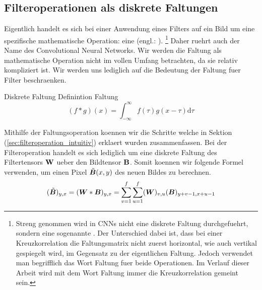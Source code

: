 \subsection{Filteroperationen als diskrete Faltungen}
Eigentlich handelt es sich bei einer Anwendung eines Filters auf ein Bild um
eine spezifische mathematische Operation: eine  (engl.:
).
\footnote{
  Streng genommen wird in CNNs nicht eine diskrete Faltung durchgefuehrt, sondern
  eine sogenannte . Der Unterschied dabei ist, dass bei einer
  Kreuzkorrelation die Faltungsmatrix nicht zuerst horizontal, wie auch vertikal
  gespiegelt wird, im Gegensatz zu der eigentlichen Faltung. Jedoch verwendet man
  begrifflich das Wort Faltung fuer beide Operationen. Im Verlauf dieser Arbeit
  wird mit dem Wort Faltung immer die Kreuzkorrelation gemeint sein.
}
Daher ruehrt auch der Name des Convolutional Neural Networks.
Wir werden die Faltung als mathematische Operation nicht im vollen Umfang
betrachten, da sie relativ kompliziert ist. Wir werden uns lediglich auf die
Bedeutung der Faltung fuer Filter beschraenken.
\para{}
\begin{defbox}{Diskrete Faltung}
  Definintion Faltung
  \begin{equation}
    (f * g)(x) = \int_{-\infty}^{\infty} f(\tau) g(x-\tau) \text{d}\tau
  \end{equation}
\end{defbox}
\para{}
Mithilfe der Faltungsoperation koennen wir die Schritte welche in Sektion
(\ref{sec:filteroperation_intuitiv}) erklaert wurden zusammenfassen.
Bei der Filteroperation handelt es sich lediglich um eine diskrete Faltung des
Filtertensors $\mathbf{W}$ ueber den Bildtensor $\mathbf{B}$. Somit koennen wir
folgende Formel verwenden, um einen Pixel $\tilde{\bm{B}}(x,y)$ des neuen Bildes zu berechnen.
\\
\begin{equation}
  (\tilde{\bm{B}})_{y,x} = (\bm{W} * \bm{B})_{y,x} = \sum_{v=1}^{f} \sum_{u=1}^{f} (\bm{W})_{v,u}(\bm{B})_{y+v-1,x+u-1}
\end{equation}
\para{}
